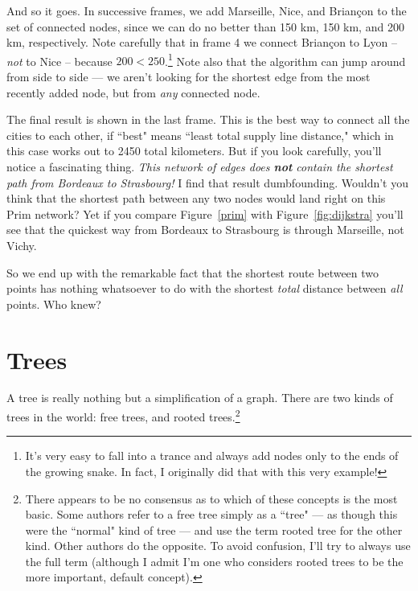 \afterpage{\clearpage}

And so it goes. In successive frames, we add Marseille, Nice, and Brian\c{c}on
to the set of connected nodes, since we can do no better than 150 km, 150 km,
and 200 km, respectively. Note carefully that in frame 4 we connect
Brian\c{c}on to Lyon -- \textit{not} to Nice -- because $200 <
250$.\footnote{It's very easy to fall into a trance and always add nodes only
to the ends of the growing snake. In fact, I originally did that with this very
example!} Note also that
the algorithm can jump around from side to side --- we aren't looking for the
shortest edge from the most recently added node, but from \textit{any}
connected node.

The final result is shown in the last frame. This is the best way to connect
all the cities to each other, if ``best" means ``least total supply line
distance," which in this case works out to 2450 total kilometers. But if you
look carefully, you'll notice a fascinating thing. \textit{This network of
edges does \textbf{not} contain the shortest path from Bordeaux to Strasbourg!}
I find that result dumbfounding. Wouldn't you think that the shortest path
between any two nodes would land right on this Prim network? Yet if you compare
Figure~\ref{prim} with Figure~\ref{fig:dijkstra} you'll see that the quickest
way from Bordeaux to Strasbourg is through Marseille, not Vichy.

So we end up with the remarkable fact that the shortest route between two
points has nothing whatsoever to do with the shortest \textit{total}
distance between \textit{all} points. Who knew?






\section{Trees}

A tree is really nothing but a simplification of a graph. There are two
kinds of trees in the world: free trees, and rooted trees.\footnote{There
appears to be no consensus as to which of these concepts is the most basic.
Some authors refer to a free tree simply as a ``tree" --- as though this
were the ``normal" kind of tree --- and use the term rooted tree for the
other kind. Other authors do the opposite. To avoid confusion, I'll try to
always use the full term (although I admit I'm one who considers rooted
trees to be the more important, default concept).}


